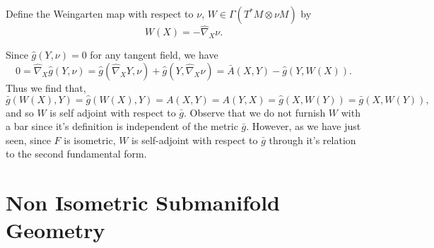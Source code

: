 \documentclass{article}
\begin{document}
Define the Weingarten map with respect to $\nu$, $W \in \Gamma(T^{\ast}M \otimes \nu M)$ by
\[
W(X) = - \hat{\nabla}_X \nu.
\]

Since $\hat{g}(Y, \nu) = 0$ for any tangent field, we have
\[
0 = \hat{\nabla}_X \hat{g} (Y, \nu) = \hat{g}(\hat{\nabla}_X Y, \nu) + \hat{g} (Y, \hat{\nabla}_X \nu) = \bar{A}(X, Y) - \hat{g}(Y, W(X)).
\]
Thus we find that,
\[
\bar{g} (W(X), Y) = \hat{g} (W(X), Y) = A(X, Y) = A(Y, X) = \hat{g}(X, W(Y)) = \bar{g}(X, W(Y)),
\]
and so $W$ is self adjoint with respect to $\bar{g}$. Observe that we do not furnish $W$ with a bar since it's definition is independent of the metric $\bar{g}$. However, as we have just seen, since $F$ is isometric, $W$ is self-adjoint with respect to $\bar{g}$ through it's relation to the second fundamental form.

\section{Non Isometric Submanifold Geometry}
\end{document}
